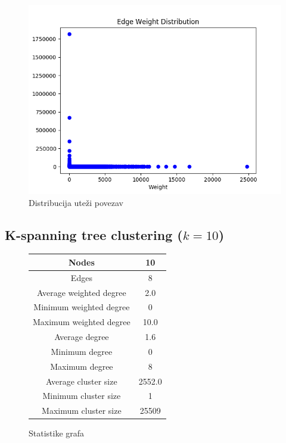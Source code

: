 \documentclass[a4paper,12pt]{article}
\begin{document}
	\begin{figure}[H]
		\centering
		\includegraphics[scale=0.7]{graph_edge_weights}
		\caption{Distribucija uteži povezav}
	\end{figure}

	\subsection{K-spanning tree clustering ($k = 10$)}
	\begin{figure}[H]
		\centering
		\begin{tabular}{ |c|c| } 
			\hline
			Nodes& 10 \\
			\hline
			Edges& 8 \\
			\hline
			Average weighted degree& 2.0 \\
			Minimum weighted degree& 0  \\
			Maximum weighted degree& 10.0 \\
			\hline
			Average degree& 1.6 \\
			Minimum degree& 0 \\ 
			Maximum degree& 8 \\
			\hline
			Average cluster size& 2552.0 \\
			Minimum cluster size& 1 \\
			Maximum cluster size& 25509 \\
			\hline
			
		\end{tabular}
		\caption{Statistike grafa}
	\end{figure}
	
\end{document}
